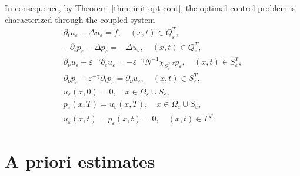 \documentclass[reqno]{amsart}
\begin{document}
In consequence, by Theorem~\ref{thm: init opt cont}, the optimal control
problem is characterized through the coupled system
\begin{equation}
\begin{gathered}
\partial _{t}u_{\varepsilon }-\Delta u_{\varepsilon }=f, \quad (x,t)\in
Q_{\varepsilon }^{T}, \\
-\partial _{t}p_{\varepsilon }-\Delta p_{\varepsilon }=-\Delta
u_{\varepsilon }, \quad (x,t)\in Q_{\varepsilon }^{T}, \\
\partial _{\nu }u_{\varepsilon }+\varepsilon ^{-\gamma }\partial
_{t}u_{\varepsilon }=-\varepsilon ^{-\gamma }N^{-1}\chi _{S_{\varepsilon
}^{2, T}}p_{\varepsilon }, \quad (x,t)\in S_{\varepsilon }^{T}, \\
\partial _{\nu }p_{\varepsilon }-\varepsilon ^{-\gamma }\partial
_{t}p_{\varepsilon }=\partial _{\nu }u_{\varepsilon }, \quad (x,t)\in
S_{\varepsilon }^{T}, \\
u_{\varepsilon }(x,0)=0, \quad x\in \Omega _{\varepsilon }\cup S_{\varepsilon
}, \\
p_{\varepsilon }(x,T)=u_{\varepsilon }(x,T), \quad x\in \Omega _{\varepsilon
}\cup S_{\varepsilon }, \\
u_{\varepsilon }(x,t)=p_{\varepsilon }(x,t)=0, \quad (x,t)\in \Gamma ^{T}.%
\end{gathered}  \label{init coupled prob}
\end{equation}

\section{A priori estimates}
\end{document}
